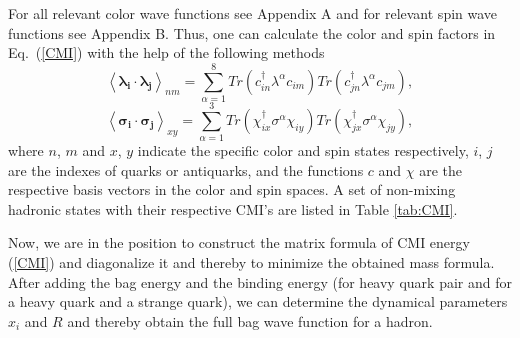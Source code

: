 \documentclass[prd,twocolumn,floatfix,nofootinbib]{revtex4}
\begin{document}
For all relevant color wave functions see Appendix A and for relevant spin wave functions see Appendix B. Thus, one can calculate the color and spin factors in Eq.~(\ref{CMI}) with the help of the following methods
\begin{equation}\label{colorfc}
    {\left\langle \boldsymbol{\lambda_{i}}\cdot \boldsymbol{\lambda_{j}} \right\rangle}_{nm}=
    \sum_{\alpha=1}^{8} Tr\left(c_{in}^{\dagger}\lambda^{\alpha}c_{im}\right) Tr\left(c_{jn}^{\dagger}\lambda^{\alpha}c_{jm}\right),
\end{equation}
\begin{equation}\label{spinfc}
    {\left\langle \boldsymbol{\sigma_{i}}\cdot \boldsymbol{\sigma_{j}} \right\rangle}_{xy}=
    \sum_{\alpha=1}^{3} Tr\left(\chi_{ix}^{\dagger}\sigma^{\alpha}\chi_{iy}\right) Tr\left(\chi_{jx}^{\dagger}\sigma^{\alpha}\chi_{jy}\right),
\end{equation}
where $n$, $m$ and $x$, $y$ indicate the specific color and spin states respectively, $i$, $j$ are the indexes of quarks or antiquarks, and the functions $c$ and $\chi$ are the respective basis vectors in the color and spin spaces.
A set of non-mixing hadronic states with their respective CMI's are listed in Table \ref{tab:CMI}. 

Now, we are in the position to construct the matrix formula of CMI energy (\ref{CMI}) and diagonalize it and thereby to minimize the obtained mass formula. 
After adding the bag energy and the binding energy (for heavy quark pair and for a heavy quark and a strange quark), we can determine the dynamical parameters $x_{i}$ and $R$ and thereby obtain the full bag wave function for a hadron.  
\end{document}
